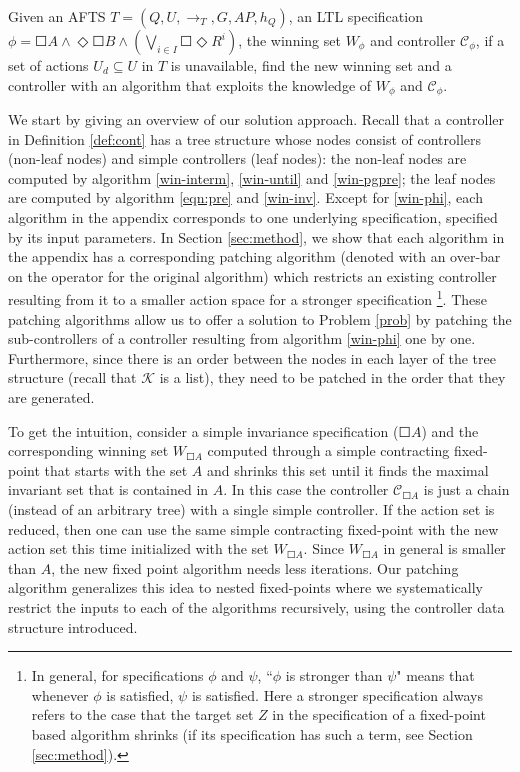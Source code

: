 \begin{problem}
	Given an AFTS $ T = (Q,U,\rightarrow_T,G,AP,h_Q) $, an LTL specification $ \phi = \Square A \wedge \Diamond \Square B \wedge \left( \bigvee_{i\in I} \Square \Diamond R^i\right) $, the winning set $ W_{\phi} $ and controller $ \mathcal{C}_{\phi} $, if a set of actions $ U_d\subseteq U $ in $ T $ is unavailable, find the new winning set and a controller with an algorithm that exploits the knowledge of $ W_{\phi} $ and $ \mathcal{C}_{\phi} $.\label{prob}
\end{problem}

We start by giving an overview of our solution approach. Recall that a controller in Definition \ref{def:cont} has a tree structure whose nodes consist of controllers (non-leaf nodes) and simple controllers (leaf nodes): the non-leaf nodes are computed by algorithm \eqref{win-interm}, \eqref{win-until} and \eqref{win-pgpre}; the leaf nodes are computed by algorithm \eqref{eqn:pre} and \eqref{win-inv}. Except for \eqref{win-phi}, each algorithm in the appendix corresponds to one underlying specification, specified by its input parameters. In Section \ref{sec:method}, we show that each algorithm in the appendix has a corresponding patching algorithm (denoted with an over-bar on the operator for the original algorithm) which restricts an existing controller resulting from it to a smaller action space for a stronger specification \footnote{In general, for specifications $ \phi $ and $ \psi $, ``$ \phi $ is stronger than $ \psi $"  means that whenever $ \phi $ is satisfied, $ \psi $ is satisfied. Here a stronger specification always refers to the case that the target set $ Z $ in the specification of a fixed-point based algorithm shrinks (if its specification has such a term, see Section \ref{sec:method}).}. These patching algorithms allow us to offer a solution to Problem \ref{prob} by patching the sub-controllers of a controller resulting from algorithm \eqref{win-phi} one by one. Furthermore, since there is an order between the nodes in each layer of the tree structure (recall that $ \mathcal{K} $ is a list), they need to be patched in the order that they are generated. 

To get the intuition, consider a simple invariance specification ($\Square A$) and the corresponding winning set $W_{\Square A}$ computed through a simple contracting fixed-point that starts with the set $A$ and shrinks this set until it finds the maximal invariant set that is contained in $A$. In this case the controller $\mathcal{C}_{\Square A}$ is just a chain (instead of an arbitrary tree) with a single simple controller. If the action set is reduced, then one can use the same simple contracting fixed-point with the new action set this time initialized with the set $W_{\Square A}$. Since $W_{\Square A}$ in general is smaller than $A$, the new fixed point algorithm needs less iterations. Our patching algorithm generalizes this idea to nested fixed-points where we systematically  restrict the inputs to each of the algorithms recursively, using the controller data structure introduced.  

